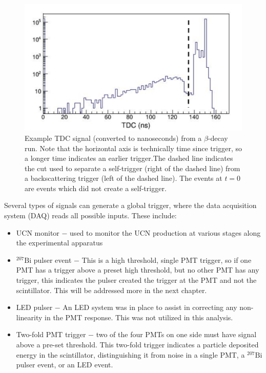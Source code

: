 \begin{figure}
  \centering
  \includegraphics[page=1,scale=0.60]{2-UCNAExperiment/TDCSignal.pdf}
  \caption{Example TDC signal (converted to nanoseconds) from a $\beta$-decay run.
    Note that the horizontal axis is technically time since trigger, so a longer time indicates an earlier
    trigger.The dashed line
    indicates the cut used to separate a self-trigger (right of the dashed line) from a backscattering trigger
    (left of the dashed line).  The events at $t=0$ are events which did not create a self-trigger.}
  \label{fig:TDCsig}
\end{figure}


Several types of signals can generate a global trigger, where the data acquisition system (DAQ)
reads all possible inputs. These include:
%
\begin{itemize}
\item UCN monitor $-$ used to monitor the UCN production at various
  stages along the experimental apparatus
\item $^{207}\mathrm{Bi}$ pulser event $-$ This is a high threshold, single PMT trigger, so if one PMT
  has a trigger above a preset high threshold, but no other PMT has any trigger, this indicates the
  pulser created the trigger at the PMT and not the scintillator. This will be addressed more in the
  next chapter.
\item LED pulser $-$ An LED system was in place to assist in correcting any non-linearity in the
  PMT response. This was not utilized in this analysis.
\item Two-fold PMT trigger $-$ two of the four PMTs on one side must have signal above a pre-set
  threshold. This two-fold trigger indicates a particle deposited energy in the scintillator,
  distinguishing it from noise in a single PMT, a $^{207}\mathrm{Bi}$ pulser event, or an LED event.
\end{itemize}


